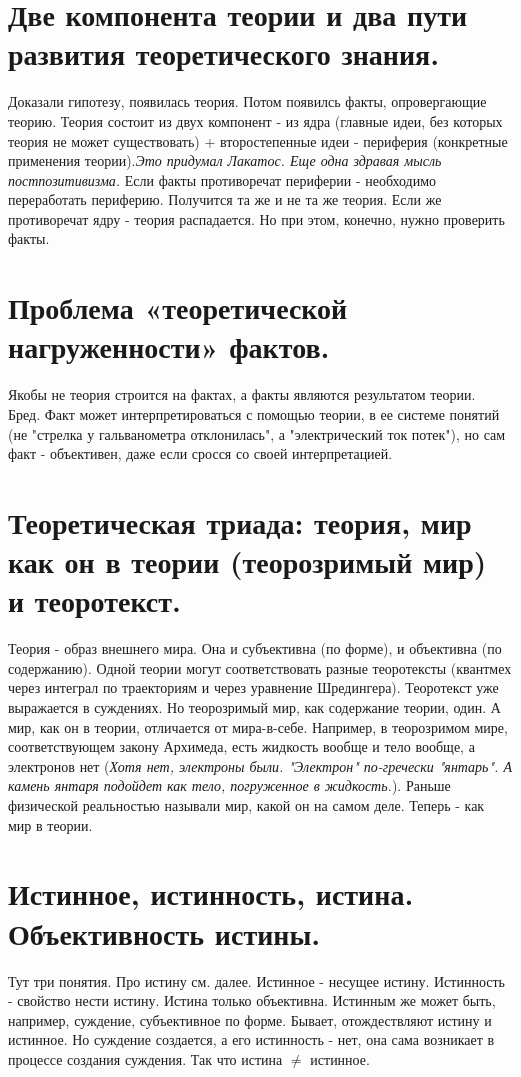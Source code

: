 \section{ Две компонента теории и два пути развития теоретического знания.}
Доказали гипотезу, появилась теория. Потом появилсь факты, опровергающие теорию. Теория состоит из двух компонент - из ядра (главные идеи, без которых теория не может существовать) + второстепенные идеи - периферия (конкретные применения теории).\textit{Это придумал Лакатос. Еще одна здравая мысль постпозитивизма.} Если факты противоречат периферии - необходимо переработать периферию. Получится та же и не та же теория. Если же противоречат ядру - теория распадается. Но при этом, конечно, нужно проверить факты.

\section{ Проблема «теоретической нагруженности» фактов.}
Якобы не теория строится на фактах, а факты являются результатом теории. Бред. Факт может интерпретироваться с помощью теории, в ее системе понятий (не "стрелка у гальванометра отклонилась", а "электрический ток потек"), но сам факт - объективен, даже если сросся со своей интерпретацией.

\section{ Теоретическая триада: теория, мир как он в теории (теорозримый мир) и теоротекст.}
Теория - образ внешнего мира. Она и субъективна (по форме), и объективна (по содержанию). Одной теории могут соответствовать разные теоротексты (квантмех через интеграл по траекториям и через уравнение Шредингера). Теоротекст уже выражается в суждениях. Но теорозримый мир, как содержание теории, один. А мир, как он в теории, отличается от мира-в-себе. Например, в теорозримом мире, соответствующем закону Архимеда, есть жидкость вообще и тело вообще, а электронов нет (\textit{Хотя нет, электроны были. "Электрон" по-гречески "янтарь". А камень янтаря подойдет как тело, погруженное в жидкость.}). Раньше физической реальностью называли мир, какой он на самом деле. Теперь - как мир в теории.

\section{ Истинное, истинность, истина. Объективность истины.}
Тут три понятия. Про истину см. далее. Истинное - несущее истину. Истинность - свойство нести истину. Истина только объективна. Истинным же может быть, например, суждение, субъективное по форме. Бывает, отождествляют истину и истинное. Но суждение создается, а его истинность - нет, она сама возникает в процессе создания суждения. Так что истина $\ne$ истинное.

